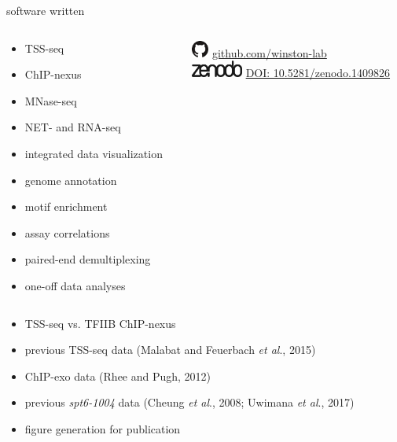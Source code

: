 \documentclass[aspectratio=169]{beamer}
\begin{document}
\begin{frame}{software written}
    \begin{columns}
        \begin{column}{0.5\textwidth}
            \begin{itemize}
                \item TSS-seq
                \item ChIP-nexus
                \item MNase-seq
                \item NET- and RNA-seq
                \item integrated data visualization
                \item genome annotation
                \item motif enrichment
                \item assay correlations
                \item paired-end demultiplexing
                \item one-off data analyses
            \end{itemize}
        \end{column}
        \begin{column}{0.5\textwidth}
            \hspace{2.7em} \includegraphics[height=1.5em]{figures/github-small.pdf} \href{https://github.com/winston-lab}{github.com/winston-lab} \\
            \vspace{1em}
            \includegraphics[height=1.5em]{figures/zenodo-black.pdf} \href{https://doi.org/10.5281/zenodo.1409826}{DOI: 10.5281/zenodo.1409826}
        \end{column}
    \end{columns}
    \begin{itemize}
        \item \small TSS-seq vs. TFIIB ChIP-nexus
        \item \small previous TSS-seq data (Malabat and Feuerbach \textit{et al}., 2015)
        \item \small ChIP-exo data (Rhee and Pugh, 2012)
        \item \small previous \textit{spt6-1004} data (Cheung \textit{et al}., 2008; Uwimana \textit{et al}., 2017)
        \item \small figure generation for publication
    \end{itemize}
\end{frame}
\end{document}
